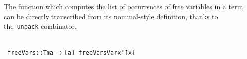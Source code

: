 \documentclass[9pt,preprint,authoryear]{sigplanconf}
\begin{document}
%
The function which computes the list of occurrences of free variables in a term can
    be directly transcribed from its nominal-style definition, thanks
    to the{~}\textcolor[rgb]{0,0,0.80}{\texttt{unpack}} combinator.%


{\nopagebreak }

%
%
%
~\\~\vphantom{$\{$}\textcolor[rgb]{0,0,0.80}{\texttt{freeVars}}\textcolor[rgb]{0,0,0.80}{\texttt{\mbox{\hspace{0.50em}}}}\textcolor[cmyk]{0,0.65,0.99,0}{\texttt{{:}{:}}}\textcolor[rgb]{0,0,0.80}{\texttt{\mbox{\hspace{0.50em}}}}\textcolor[rgb]{0,0,0.80}{\texttt{Tm}}\textcolor[rgb]{0,0,0.80}{\texttt{\mbox{\hspace{0.50em}}}}\textcolor[rgb]{0,0,0.80}{\texttt{a}}\textcolor[rgb]{0,0,0.80}{\texttt{\mbox{\hspace{0.50em}}}}\textcolor[cmyk]{0,0.65,0.99,0}{\texttt{$ \rightarrow $}}\textcolor[rgb]{0,0,0.80}{\texttt{\mbox{\hspace{0.50em}}}}\textcolor[cmyk]{0,0.65,0.99,0}{\texttt{{[}}}\textcolor[rgb]{0,0,0.80}{\texttt{a}}\textcolor[cmyk]{0,0.65,0.99,0}{\texttt{{]}}}\textcolor[rgb]{0,0,0.80}{\texttt{{\nopagebreak \newline%
}\vphantom{$\{$}}}\textcolor[rgb]{0,0,0.80}{\texttt{freeVars}}\textcolor[rgb]{0,0,0.80}{\texttt{\mbox{\hspace{0.50em}}}}\textcolor[cmyk]{0,0.65,0.99,0}{\texttt{\makebox[1.22ex][l]{$ {(} $}}}\textcolor[rgb]{0.70,0.13,0.13}{\texttt{Var}}\textcolor[rgb]{0,0,0.80}{\texttt{\mbox{\hspace{0.50em}}}}\textcolor[rgb]{0,0,0.80}{\texttt{x}}\textcolor[cmyk]{0,0.65,0.99,0}{\texttt{\makebox[1.22ex][r]{$ {)} $}}}\textcolor[rgb]{0,0,0.80}{\texttt{\mbox{\hspace{0.50em}}}}\textcolor[cmyk]{0,0.65,0.99,0}{\texttt{{\char `\=}}}\textcolor[rgb]{0,0,0.80}{\texttt{\mbox{\hspace{0.50em}}}}\textcolor[cmyk]{0,0.65,0.99,0}{\texttt{{[}}}\textcolor[rgb]{0,0,0.80}{\texttt{x}}\textcolor[cmyk]{0,0.65,0.99,0}{\texttt{{]}}}\textcolor[rgb]{0,0,0.80}{\texttt{{\nopagebreak \newline%
}}}
\end{document}
